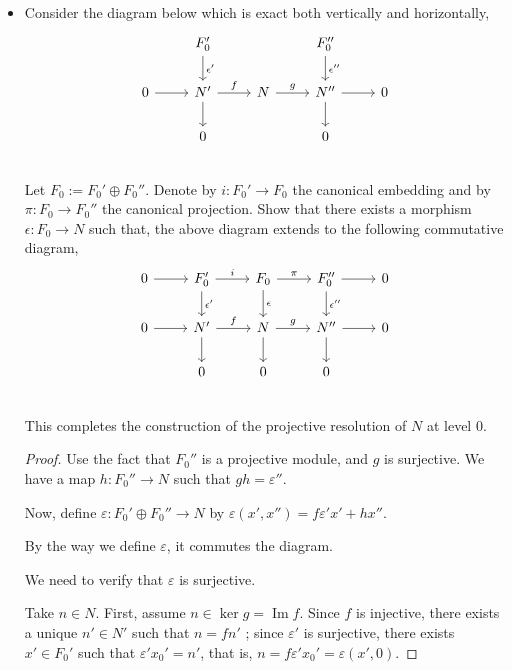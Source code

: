 \begin{enumerate}
\begin{itemize}
\item Consider the diagram below which is exact both vertically and horizontally,
\begin{equation*}
        \begin{tikzcd}
        & F_0' \arrow[d, "\epsilon'"]     &  & F_0'' \arrow[d, "\epsilon''"] &  \\
        0 \arrow[r] & N' \arrow[r, "f"]\arrow[d]  &  N \arrow[r, "g"]  & N'' \arrow[r]\arrow[d]  & 0\\
                    & 0                 &                 & 0             &  \\
        \end{tikzcd}
\end{equation*}
Let $F_0:= F_0' \oplus F_0''$. Denote by $i: F_0' \to F_0$ the canonical embedding and by $ \pi: F_0 \to F_0''$ the canonical projection. Show that there exists a morphism $\epsilon: F_0 \to N$ such that, the above diagram extends to the following commutative diagram,
\begin{equation}\label{eqn:diagram1}
        \begin{tikzcd}
        0 \arrow[r] & F_0' \arrow[r, "i"]\arrow[d, "\epsilon'"]     &  F_0 \arrow[r, "\pi"]\arrow[d, "\epsilon"] & F_0'' \arrow[r]\arrow[d, "\epsilon''"] & 0 \\
        0 \arrow[r] & N' \arrow[r, "f"]\arrow[d]  &  N \arrow[r, "g"]\arrow[d]  & N'' \arrow[r]\arrow[d]  & 0\\
                    & 0                 &  0                & 0             &  \\
        \end{tikzcd}
\end{equation}
This completes the construction of the projective resolution of $N$ at level 0.

\begin{proof}
	 Use the fact that $F_0''$ is a projective module, and $g$ is surjective. We have a map $h: F_0'' \to  N$ such that $g h = \varepsilon''$.

	 Now, define $\varepsilon: F_0' \oplus F_0'' \to N$ by $\varepsilon\left( x', x'' \right)  = f \varepsilon' x' + h x''$.

	 By the way we define $\varepsilon$, it commutes the diagram.

	 We need to verify that $\varepsilon$ is surjective.

	 Take $n \in N$. First, assume $n \in \operatorname{ker} g = \operatorname{Im} f$. Since $f$ is injective, there exists a unique $n' \in N'$ such that $n = f n'$ ; since $\varepsilon'$ is surjective, there exists $x' \in F_0'$ such that $\varepsilon' x_0' = n'$, that is, $n = f \varepsilon' x_0' = \varepsilon \left( x',0 \right) $.


\end{proof}
\end{itemize}
\end{enumerate}

